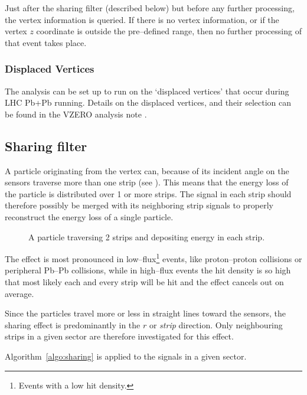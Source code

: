 \documentclass[11pt]{article}
\begin{document}
Just after the sharing filter (described below) but before any further
processing, the vertex information is queried.  If there is no vertex
information, or if the vertex $z$ coordinate is outside the
pre--defined range, then no further processing of that event takes
place.

\subsubsection{Displaced Vertices}
\label{sec:sub:sub:dispvtx}

The analysis can be set up to run on the `displaced vertices' that
occur during LHC Pb+Pb running. Details on the displaced vertices, and
their selection can be found in the VZERO analysis note \cite{maxime}.

\subsection{Sharing filter}
\label{sec:sub:sharing_filter}

A particle originating from the vertex can, because of its incident
angle on the \FMD{} sensors traverse more than one strip (see
).  This means that the energy loss of the
particle is distributed over 1 or more strips.  The signal in each
strip should therefore possibly be merged with its neighboring strip
signals to properly reconstruct the energy loss of a single particle.

\begin{figure}[htbp]
  \centering
  \caption{A particle traversing 2 strips and depositing energy in
    each strip. }
  \label{fig:share_fraction}
\end{figure}

The effect is most pronounced in low--flux\footnote{Events with a low
  hit density.} events, like proton--proton collisions or peripheral
Pb--Pb collisions, while in high--flux events the hit density is so
high that most likely each and every strip will be hit and the effect
cancels out on average.

Since the particles travel more or less in straight lines toward the
\FMD{} sensors, the sharing effect is predominantly in the $r$ or
\emph{strip} direction.  Only neighbouring strips in a given sector are
therefore investigated for this effect.  

Algorithm~\ref{algo:sharing} is applied to the signals in a given
sector.
\end{document}
